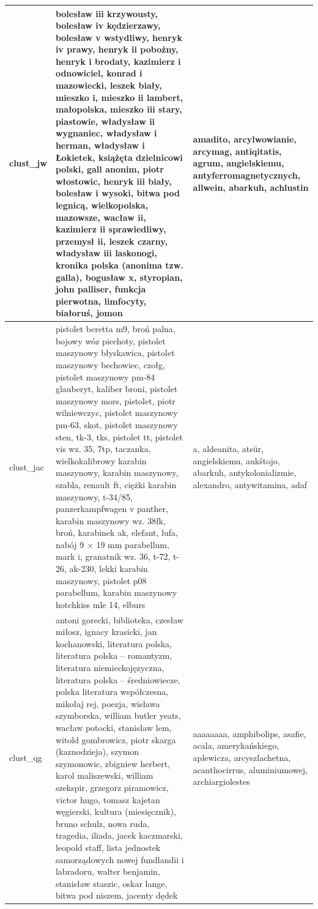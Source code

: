 \documentclass{praca1}
\begin{document}
\begin{table}[ht]
\begin{tabular}{lll}
   \hline
clust\_jw & bolesław iii krzywousty, bolesław iv kędzierzawy, bolesław v wstydliwy, henryk iv prawy, henryk ii pobożny, henryk i brodaty, kazimierz i odnowiciel, konrad i mazowiecki, leszek biały, mieszko i, mieszko ii lambert, małopolska, mieszko iii stary, piastowie, władysław ii wygnaniec, władysław i herman, władysław i Łokietek, książęta dzielnicowi polski, gall anonim, piotr włostowic, henryk iii biały, bolesław i wysoki, bitwa pod legnicą, wielkopolska, mazowsze, wacław ii, kazimierz ii sprawiedliwy, przemysł ii, leszek czarny, władysław iii laskonogi, kronika polska (anonima tzw. galla), bogusław x, styropian, john palliser, funkcja pierwotna, limfocyty, białoruś, jomon & amadito, arcylwowianie, arcymag, antiqitatis, agrum, angielskiemu, antyferromagnetycznych, allwein, abarkuh, achlustin \\ 
   \hline
clust\_jac & pistolet beretta m9, broń palna, bojowy wóz piechoty, pistolet maszynowy błyskawica, pistolet maszynowy bechowiec, czołg, pistolet maszynowy pm-84 glauberyt, kaliber broni, pistolet maszynowy mors, pistolet, piotr wilniewczyc, pistolet maszynowy pm-63, skot, pistolet maszynowy sten, tk-3, tks, pistolet tt, pistolet vis wz. 35, 7tp, taczanka, wielkokalibrowy karabin maszynowy, karabin maszynowy, szabla, renault ft, ciężki karabin maszynowy, t-34/85, panzerkampfwagen v panther, karabin maszynowy wz. 38fk, broń, karabinek ak, elefant, lufa, nabój 9 $\times$ 19 mm parabellum, mark i, granatnik wz. 36, t-72, t-26, ak-230, lekki karabin maszynowy, pistolet p08 parabellum, karabin maszynowy hotchkiss mle 14, elburs & a, aldeanita, atsür, angielskiemu, aukštojo, abarkuh, antykolonializmie, alexandro, antywitamina, adaf \\ 
   \hline
clust\_qg & antoni gorecki, biblioteka, czesław miłosz, ignacy krasicki, jan kochanowski, literatura polska, literatura polska – romantyzm, literatura niemieckojęzyczna, literatura polska – średniowiecze, polska literatura współczesna, mikołaj rej, poezja, wisława szymborska, william butler yeats, wacław potocki, stanisław lem, witold gombrowicz, piotr skarga (kaznodzieja), szymon szymonowic, zbigniew herbert, karol maliszewski, william szekspir, grzegorz piramowicz, victor hugo, tomasz kajetan węgierski, kultura (miesięcznik), bruno schulz, nowa ruda, tragedia, iliada, jacek kaczmarski, leopold staff, lista jednostek samorządowych nowej fundlandii i labradoru, walter benjamin, stanisław staszic, oskar lange, bitwa pod niszem, jacenty dędek & aaaaaaaa, amphibolips, asafie, acala, amerykańskiego, aplewicza, arcyszlachetna, acanthocirrus, aluminiumowej, archiargiolestes \\ 

\end{tabular}
\end{table}
\end{document}
